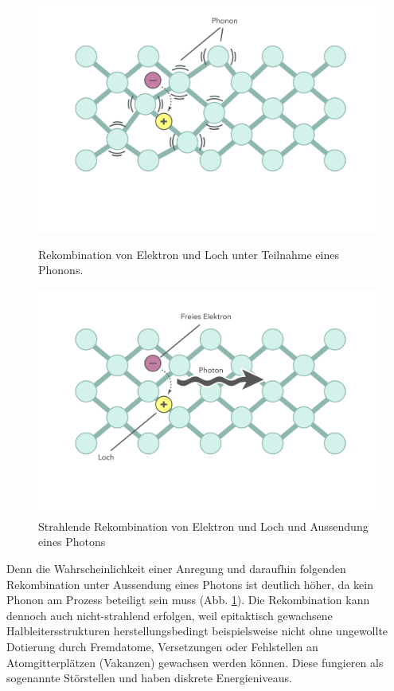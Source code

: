 \begin{figure}[htb]
    \centering
    \begin{minipage}[t]{0.49\linewidth}
        \centering
        \includegraphics[width=\linewidth]{Bilder/nonradRekomb.png}
        \caption{Rekombination von Elektron und Loch unter Teilnahme eines Phonons.}
				\label{fig:rekombphoton}
    \end{minipage}%
    \hfill
    \begin{minipage}[t]{0.49\linewidth}
        \centering
        \includegraphics[width=\linewidth]{Bilder/radRekomb.png}
        \caption{Strahlende Rekombination von Elektron und Loch und Aussendung eines Photons}
    \end{minipage}
\end{figure}
\noindent
Denn die Wahrscheinlichkeit einer Anregung und daraufhin folgenden Rekombination unter Aussendung eines Photons ist deutlich höher, da kein Phonon am Prozess beteiligt sein muss (Abb. \ref{fig:rekombphoton}). Die Rekombination kann dennoch auch nicht-strahlend erfolgen, weil epitaktisch gewachsene Halbleitersstrukturen herstellungsbedingt beispielsweise nicht ohne ungewollte Dotierung durch Fremdatome, Versetzungen oder Fehlstellen an Atomgitterplätzen (Vakanzen) gewachsen werden können. Diese fungieren als sogenannte Störstellen und haben diskrete Energieniveaus. 
